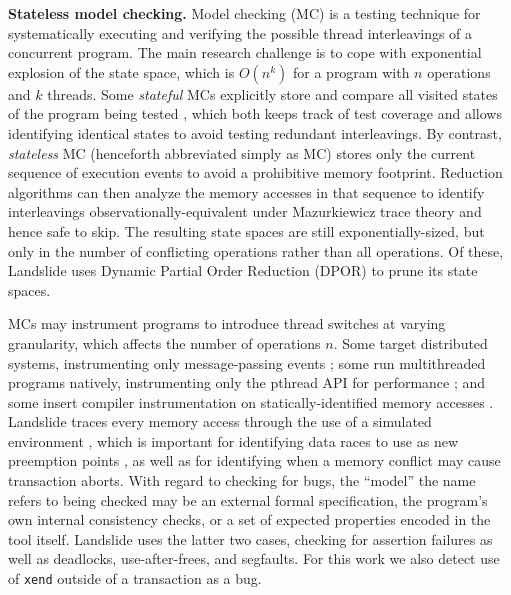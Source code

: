 \documentclass[10pt]{sigplanconf}
\begin{document}
{\bf Stateless model checking.}
Model checking (MC) \cite{verisoft} is a testing technique for systematically executing and verifying
the possible thread interleavings of a concurrent program.
The main research challenge is to cope with exponential explosion of the state space,
which is $O(n^k)$ for a program with $n$ operations and $k$ threads.
Some {\em stateful} MCs explicitly store and compare all visited states of the program being tested \cite{spin},
which both keeps track of test coverage
and allows identifying identical states to avoid testing redundant interleavings.
%
By contrast, {\em stateless} MC (henceforth abbreviated simply as MC)
stores only the current sequence of execution events to avoid a prohibitive memory footprint.
Reduction algorithms \cite{dpor,optimal-dpor,satcheck,mcr,mcr,tsopso}
can then analyze the memory accesses in that sequence to identify
interleavings observationally-equivalent under Mazurkiewicz trace theory \cite{mazurkiewicz} and hence safe to skip.
The resulting state spaces are still exponentially-sized,
but only in the number of conflicting operations rather than all operations.
Of these, Landslide uses Dynamic Partial Order Reduction (DPOR) \cite{dpor} to prune its state spaces.

MCs may instrument programs to introduce thread switches at varying granularity, which affects the number of operations $n$.
Some target distributed systems, instrumenting only message-passing events \cite{modist};
some run multithreaded programs natively, instrumenting only the pthread API for performance \cite{dbug-ssv};
and some insert compiler instrumentation on statically-identified memory accesses \cite{chess,inspect}.
Landslide traces every memory access through the use of a simulated environment \cite{bochs},
which is important for identifying data races to use as new preemption points \cite{fasttrack,djit,quicksand},
as well as for identifying when a memory conflict may cause transaction aborts.
With regard to checking for bugs,
the ``model'' the name refers to being checked may be
an external formal specification,
the program's own internal consistency checks,
or a set of expected properties encoded in the tool itself.
Landslide uses the latter two cases, checking for assertion failures
as well as deadlocks, use-after-frees, and segfaults.
For this work we also detect use of {\tt xend} outside of a transaction as a bug.

\end{document}
